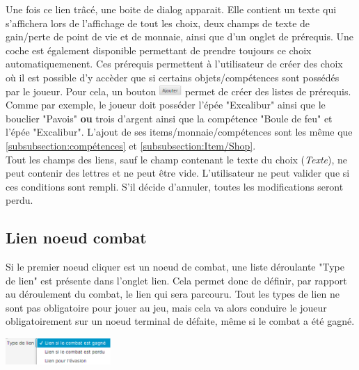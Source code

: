 		Une fois ce lien trâcé, une boite de dialog apparait. Elle contient un texte qui s'affichera lors de l'affichage de tout les choix, deux champs de texte de gain/perte de point de vie et de monnaie, ainsi que d'un onglet de prérequis. Une coche est également disponible permettant de prendre toujours ce choix automatiquemenent.
		Ces prérequis permettent à l'utilisateur de créer des choix où il est possible d'y accèder que si certains objets/compétences sont possédés par le joueur.
		Pour cela, un bouton \includegraphics[height=10pt]{img/ajouterBouton.png} permet de créer des listes de prérequis. Comme par exemple, le joueur doit posséder l'épée "Excalibur" ainsi que le bouclier "Pavois" \textbf{ou} trois d'argent ainsi que la compétence "Boule de feu" et l'épée "Excalibur".
		L'ajout de ses items/monnaie/compétences sont les même que \ref{subsubsection:compétences} et \ref{subsubsection:Item/Shop}.\\

		Tout les champs des liens, sauf le champ contenant le texte du choix (\textit{Texte}), ne peut contenir des lettres et ne peut être vide. L'utilisateur ne peut valider que si ces conditions sont rempli. S'il décide d'annuler, toutes les modifications seront perdu.\\

		\subsection{Lien noeud combat}\label{subsection:lienCombat}
			\begin{minipage}{0.70\textwidth}
				Si le premier noeud cliquer est un noeud de combat, une liste déroulante "Type de lien" est présente dans l'onglet lien. Cela permet donc de définir, par rapport au déroulement du combat, le lien qui sera parcouru. Tout les types de lien ne sont pas obligatoire pour jouer au jeu, mais cela va alors conduire le joueur obligatoirement sur un noeud terminal de défaite, même si le combat a été gagné.
			\end{minipage}
			\hfill
			\begin{minipage}{4cm}
				\includegraphics[width=4cm]{img/lienCombat.png}
			\end{minipage}

